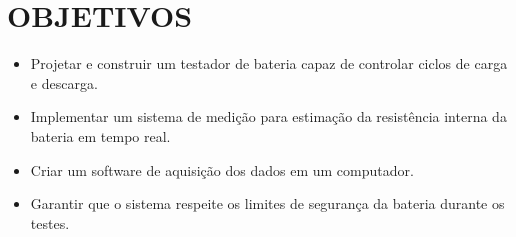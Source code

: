 \chapter{OBJETIVOS} \label{cha:objetivos}

\begin{itemize}
    \item Projetar e construir um testador de bateria capaz de controlar ciclos de carga e descarga.
    \item Implementar um sistema de medição para estimação da resistência interna da bateria em tempo real.
    \item Criar um software de aquisição dos dados em um computador.
    \item Garantir que o sistema respeite os limites de segurança da bateria durante os testes.
\end{itemize}
